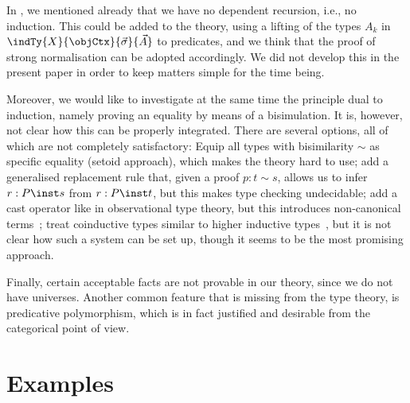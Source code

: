\documentclass[preprint]{sigplanconf}
\begin{document}
In , we mentioned already that we have no dependent
recursion, i.e., no induction.
This could be added to the theory, using a lifting of the types $A_k$ in
$\indTy{X}{\objCtx}{\vec{\sigma}}{\vec{A}}$ to predicates, and we think that
the proof of strong normalisation can be adopted accordingly.
We did not develop this in the present paper in order to keep matters simple for
the time being.

Moreover, we would like to investigate at the same time the principle dual to
induction, namely proving an equality by means of a bisimulation.
It is, however, not clear how this can be properly integrated.
There are several options, all of which are not completely satisfactory:
Equip all types with bisimilarity $\sim$ as specific equality (setoid approach),
which makes the theory hard to use; add a generalised replacement rule that,
given a proof $p : t \sim s$, allows us to infer $r : P \inst s$ from
$r : P \inst t$, but this makes type checking undecidable; add a cast operator
like in observational type theory, but this introduces non-canonical
terms~\cite{Altenkirch2007-ObsEq}; treat coinductive
types similar to higher inductive types~\cite{hottbook}, but it is not clear how
such a system can be set up, though it seems to be the most promising approach.

Finally, certain acceptable facts are not provable in our theory, since we do
not have universes.
Another common feature that is missing from the type theory, is predicative
polymorphism, which is in fact justified and desirable from the categorical
point of view.

%
 



\clearpage
\appendix
\section{Examples}
\label{app:examples}
\end{document}
